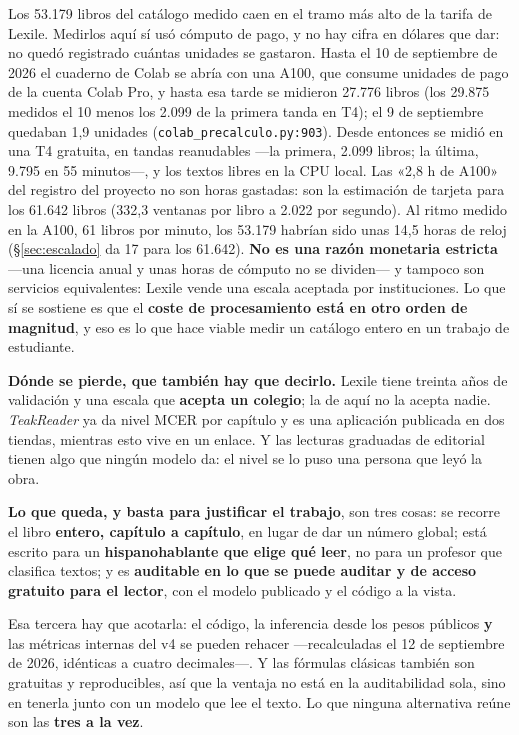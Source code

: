 \documentclass[11pt,a4paper]{article}
\newcommand{\cod}[1]{\texttt{\small #1}}
\begin{document}
Los 53.179 libros del catálogo medido caen en el tramo más alto de la tarifa de Lexile. Medirlos
aquí sí usó cómputo de pago, y no hay cifra en dólares que dar: no quedó registrado cuántas
unidades se gastaron. Hasta el 10 de septiembre de 2026 el cuaderno de Colab se abría con una
A100, que consume unidades de pago de la cuenta Colab Pro, y hasta esa tarde se midieron
27.776 libros (los 29.875 medidos el 10 menos los 2.099 de la primera tanda en T4); el 9 de
septiembre quedaban 1,9 unidades (\cod{colab\_precalculo.py:903}). Desde entonces se midió en una T4 gratuita, en
tandas reanudables ---la primera, 2.099 libros; la última, 9.795 en 55 minutos---, y los
textos libres en la CPU local. Las «2,8 h de A100» del registro del proyecto no son horas
gastadas: son la estimación de tarjeta para los 61.642 libros (332,3 ventanas por libro a
2.022 por segundo). Al ritmo medido en la A100, 61 libros por minuto, los 53.179 habrían sido
unas 14,5 horas de reloj (\S\ref{sec:escalado} da 17 para los 61.642). \textbf{No es una razón
monetaria estricta} —una licencia anual y unas horas de cómputo no se dividen— y tampoco
son servicios equivalentes: Lexile vende una escala aceptada por instituciones. Lo que sí
se sostiene es que el \textbf{coste de procesamiento está en otro orden de magnitud}, y eso
es lo que hace viable medir un catálogo entero en un trabajo de estudiante.

\textbf{Dónde se pierde, que también hay que decirlo.} Lexile tiene treinta años de
validación y una escala que \textbf{acepta un colegio}; la de aquí no la acepta nadie.
\emph{TeakReader} \parencite{teakreader} ya da nivel MCER por capítulo y es una aplicación publicada en dos
tiendas, mientras esto vive en un enlace. Y las lecturas graduadas de editorial tienen algo
que ningún modelo da: el nivel se lo puso una persona que leyó la obra.

\textbf{Lo que queda, y basta para justificar el trabajo}, son tres cosas: se recorre el
libro \textbf{entero, capítulo a capítulo}, en lugar de dar un número global; está escrito
para un \textbf{hispanohablante que elige qué leer}, no para un profesor que clasifica
textos; y es \textbf{auditable en lo que se puede auditar y de acceso gratuito para el
lector}, con el modelo publicado y el código a la vista.

Esa tercera hay que acotarla: el código, la inferencia desde los pesos públicos \textbf{y}
las métricas internas del v4 se pueden rehacer ---recalculadas el 12 de septiembre de 2026,
idénticas a cuatro decimales---. Y las
fórmulas clásicas también son gratuitas y reproducibles, así que la ventaja no está en la
auditabilidad sola, sino en tenerla junto con un modelo que lee el texto. Lo que ninguna
alternativa reúne son las \textbf{tres a la vez}.
\end{document}
